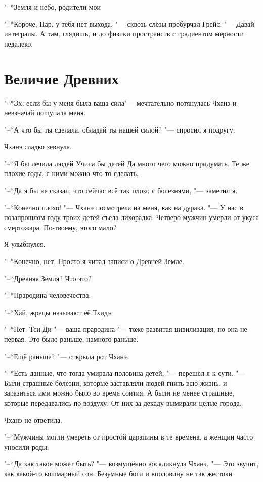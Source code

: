 \documentclass[a4paper,10pt]{book}
\newcommand{\ldotst}{\so{...}\xspace}
\begin{document}
"--*Земля и небо, родители мои\ldotst

"--*Короче, Нар, у тебя нет выхода, "--- сквозь слёзы пробурчал Грейс. "--- 
Давай 
интегралы. А там, глядишь, и до физики пространств с градиентом мерности 
недалеко.

\section {Величие Древних}

"--*Эх, если бы у меня была ваша сила\ldotst "--- мечтательно потянулась Чханэ 
и 
невзначай пощупала меня.

"--*А что бы ты сделала, обладай ты нашей силой? "--- спросил я подругу.

Чханэ сладко зевнула.

"--*Я бы лечила людей\ldotst Учила бы детей\ldotst Да много чего можно 
придумать. 
Те же плохие годы, с ними можно что-то сделать.

"--*Да я бы не сказал, что сейчас всё так плохо с болезнями, "--- заметил я.

"--*Конечно плохо! "--- Чханэ посмотрела на меня, как на дурака. "--- У нас в 
позапрошлом году троих детей съела лихорадка. Четверо мужчин умерли от укуса 
смертожара. По-твоему, этого мало?

Я улыбнулся.

"--*Конечно, нет. Просто я читал записи о Древней Земле.

"--*Древняя Земля? Что это?

"--*Прародина человечества.

"--*Хай, жрецы называют её Тхидэ.

"--*Нет. Тси-Ди "--- ваша прародина "--- тоже развитая цивилизация, но она не 
первая. Это было раньше, намного раньше.

"--*Ещё раньше? "--- открыла рот Чханэ.

"--*Есть данные, что тогда умирала половина детей, "--- перешёл я к сути. "--- 
Были страшные болезни, которые заставляли людей гнить всю жизнь, и заразиться 
ими можно было во время соития. А были не менее страшные, которые передавались 
по воздуху. От них за декаду вымирали целые города.

Чханэ не ответила.

"--*Мужчины могли умереть от простой царапины в те времена, а женщин часто 
уносили роды.

"--*Да как такое может быть? "--- возмущённо воскликнула Чханэ. "--- Это 
звучит, 
как какой-то кошмарный сон. Безумные боги и вполовину не так жестоки\ldotst
\end{document}
